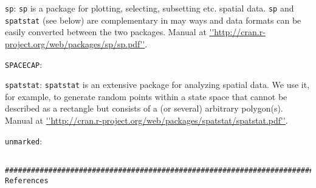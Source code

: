 {\flushleft \tt sp}:
\mbox{\tt sp}  \citep{pebesma_bivand:2011} is a package for plotting, selecting, subsetting etc. spatial data. \mbox{\tt sp}  and \mbox{\tt spatstat} (see below) are complementary in may ways and data formats can be easily converted between the two packages. Manual at \url{''http://cran.r-project.org/web/packages/sp/sp.pdf''}. 


{\flushleft \tt SPACECAP}:
 \citep{gopalaswamy_etal:2012mee} 
 
{\flushleft \tt spatstat}:
\mbox{\tt spatstat} \citep{baddeley_turner:2005} is an extensive package for analyzing spatial data. We use it, for example, to generate random points within a state space that cannot be described as a rectangle but consists of a (or several) arbitrary polygon(s). Manual at \url{''http://cran.r-project.org/web/packages/spatstat/spatstat.pdf''}. 

{\flushleft \tt unmarked}: 

\begin{verbatim}

############################################################################################################################################################################################
References

\end{verbatim}
